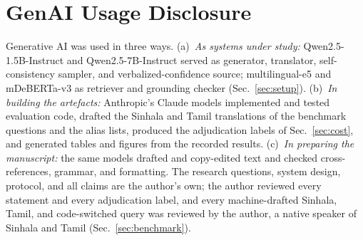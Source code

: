 \section*{GenAI Usage Disclosure}
Generative AI was used in three ways. (a)~\emph{As systems under study:} Qwen2.5-1.5B-Instruct and Qwen2.5-7B-Instruct served as generator, translator, self-consistency sampler, and verbalized-confidence source; multilingual-e5 and mDeBERTa-v3 as retriever and grounding checker (Sec.~\ref{sec:setup}). (b)~\emph{In building the artefacts:} Anthropic's Claude models implemented and tested evaluation code, drafted the Sinhala and Tamil translations of the benchmark questions and the alias lists, produced the adjudication labels of Sec.~\ref{sec:cost}, and generated tables and figures from the recorded results. (c)~\emph{In preparing the manuscript:} the same models drafted and copy-edited text and checked cross-references, grammar, and formatting. The research questions, system design, protocol, and all claims are the author's own; the author reviewed every statement and every adjudication label, and every machine-drafted Sinhala, Tamil, and code-switched query was reviewed by the author, a native speaker of Sinhala and Tamil (Sec.~\ref{sec:benchmark}).



